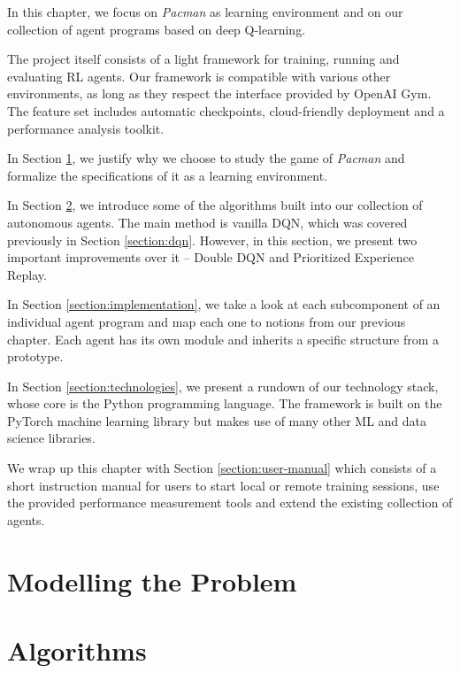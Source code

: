 In this chapter, we focus on \emph{Pacman} as learning environment and on our collection of agent programs based on deep Q-learning.

The project itself consists of a light framework for training, running and evaluating RL agents.
Our framework is compatible with various other environments, as long as they respect the interface provided by OpenAI Gym.
The feature set includes automatic checkpoints, cloud-friendly deployment and a performance analysis toolkit.

In Section \ref{section:modelling-the-problem}, we justify why we choose to study the game of \emph{Pacman} and formalize the specifications of it as a learning environment.

In Section \ref{section:approach-algorithms}, we introduce some of the algorithms built into our collection of autonomous agents.
The main method is vanilla DQN, which was covered previously in Section \ref{section:dqn}.
However, in this section, we present two important improvements over it -- Double DQN and Prioritized Experience Replay.

In Section \ref{section:implementation}, we take a look at each subcomponent of an individual agent program and map each one to notions from our previous chapter.
Each agent has its own module and inherits a specific structure from a prototype.

In Section \ref{section:technologies}, we present a rundown of our technology stack, whose core is the Python programming language. The framework is built on the PyTorch machine learning library but makes use of many other ML and data science libraries.

We wrap up this chapter with Section \ref{section:user-manual} which consists of a short instruction manual for users to start local or remote training sessions, use the provided performance measurement tools and extend the existing collection of agents.

\section{Modelling the Problem} \label{section:modelling-the-problem}

\section{Algorithms} \label{section:approach-algorithms}

